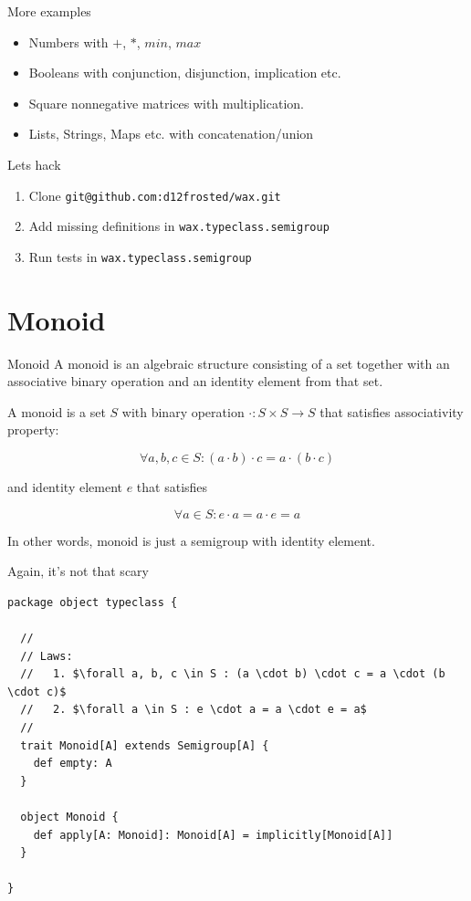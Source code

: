 \documentclass[presentation,aspectratio=169,smaller]{beamer}
\begin{document}
\begin{frame}[label={sec:org6ccb4d6}]{More examples}
\begin{itemize}
\item Numbers with \(+\), \(*\), \(min\), \(max\)
\item Booleans with conjunction, disjunction, implication etc.
\item Square nonnegative matrices with multiplication.
\item Lists, Strings, Maps etc. with concatenation/union
\end{itemize}
\end{frame}

\begin{frame}[label={sec:org8f8178a},fragile]{Lets hack}
 \begin{enumerate}
\item Clone \texttt{git@github.com:d12frosted/wax.git}
\item Add missing definitions in \texttt{wax.typeclass.semigroup}
\item Run tests in \texttt{wax.typeclass.semigroup}
\end{enumerate}
\end{frame}

\section*{Monoid}
\label{sec:org688eb4e}

\begin{frame}[label={sec:orgf489957}]{Monoid}
A monoid is an algebraic structure consisting of a set together with an
associative binary operation and an identity element from that set.

\pause

A monoid is a set \(S\) with binary operation \(\cdot : S \times S \rightarrow
S\) that satisfies associativity property:

$$\forall a, b, c \in S : (a \cdot b) \cdot c = a \cdot (b \cdot c)$$

and identity element \(e\) that satisfies

$$\forall a \in S : e \cdot a = a \cdot e = a$$

\pause

In other words, monoid is just a semigroup with identity element.
\end{frame}

\begin{frame}[label={sec:org077bd85},fragile]{Again, it's not that scary}
 \begin{verbatim}
package object typeclass {

  //
  // Laws:
  //   1. $\forall a, b, c \in S : (a \cdot b) \cdot c = a \cdot (b \cdot c)$
  //   2. $\forall a \in S : e \cdot a = a \cdot e = a$
  //
  trait Monoid[A] extends Semigroup[A] {
    def empty: A
  }

  object Monoid {
    def apply[A: Monoid]: Monoid[A] = implicitly[Monoid[A]]
  }

}
\end{verbatim}
\end{frame}
\end{document}
